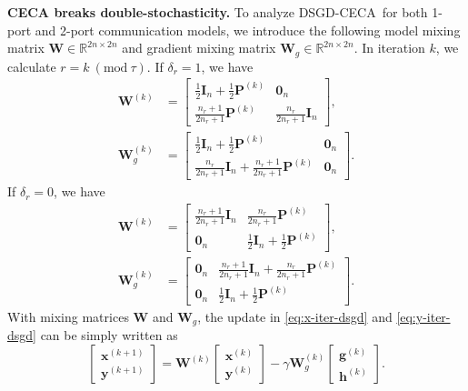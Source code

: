 \documentclass{article}
\newcommand{\vg}{\mathbf{g}}
\newcommand{\vh}{\mathbf{h}}
\newcommand{\vx}{\mathbf{x}}
\newcommand{\vy}{\mathbf{y}}
\newcommand{\vzero}{\mathbf{0}}
\newcommand{\vI}{\mathbf{I}}
\newcommand{\vW}{\mathbf{W}}
\newcommand{\vP}{\mathbf{P}}
\newcommand{\ko}{{(k)}}
\newcommand{\kp}{{(k+1)}}
\newcommand{\bbR}{\mathbb{R}}
\newcommand{\Mod}[1]{\ (\mathrm{mod}\ #1)}
\newcommand{\Ours}{DSGD-CECA}
\theoremstyle{plain}
\theoremstyle{definition}
\begin{document}
\textbf{CECA breaks double-stochasticity.} To analyze \Ours\ for both 1-port and 2-port communication models, we introduce the following model mixing matrix $\vW\in\bbR^{2n\times 2n}$ and gradient mixing matrix $\vW_g\in\bbR^{2n\times 2n}$. In iteration $k$, we calculate $r=k\Mod{\tau}$. If $\delta_r=1$, we have
\begingroup
\allowdisplaybreaks
\begin{equation}
\label{eq:W-Wg-d1}
\begin{split}
\vW^\ko&=\left[
\begin{array}{cc}
    \frac{1}{2}\vI_n+\frac{1}{2}\vP^\ko & \vzero_n \\
    \frac{n_r+1}{2n_r+1}\vP^\ko & \frac{n_r}{2n_r+1}\vI_n
\end{array}
\right], \\
\vW^\ko_g&=\left[
\begin{array}{cc}
    \frac{1}{2}\vI_n+\frac{1}{2}\vP^\ko & \vzero_n \\
    \frac{n_r}{2n_r+1}\vI_n+\frac{n_r+1}{2n_r+1}\vP^\ko & \vzero_n
\end{array}
\right].
\end{split}
\end{equation}
If $\delta_r=0$, we have
\begin{equation}
\label{eq:W-Wg-d0}
\begin{split}
\vW^\ko&=\left[
\begin{array}{cc}
    \frac{n_r+1}{2n_r+1}\vI_n & \frac{n_r}{2n_r+1}\vP^\ko \\
    \vzero_n & \frac{1}{2}\vI_n+\frac{1}{2}\vP^\ko
\end{array}
\right],  \\
\vW^\ko_g&=\left[
\begin{array}{cc}
    \vzero_n & \frac{n_r+1}{2n_r+1}\vI_n+\frac{n_r}{2n_r+1}\vP^\ko \\
    \vzero_n & \frac{1}{2}\vI_n+\frac{1}{2}\vP^\ko
\end{array}
\right].
\end{split}
\end{equation}
\endgroup
With mixing matrices $\vW$ and $\vW_g$, the update in \eqref{eq:x-iter-dsgd} and \eqref{eq:y-iter-dsgd} can be simply written as
\begin{equation}
\label{eq:iter-with-trans-matrix}
\left[
\begin{array}{c}
     \vx^\kp  \\
     \vy^\kp 
\end{array}
\right]
=\vW^\ko
\left[
\begin{array}{c}
     \vx^\ko  \\
     \vy^\ko 
\end{array}
\right]
-\gamma \vW^\ko_g
\left[
\begin{array}{c}
     \vg^\ko  \\
     \vh^\ko 
\end{array}
\right].
\end{equation}
\end{document}

